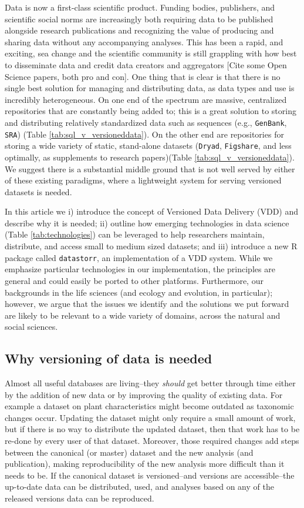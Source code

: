\documentclass[a4paper,11pt]{article}
\begin{document}
Data is now a first-class scientific product. Funding bodies, publishers, and scientific social norms are increasingly both requiring data to be published alongside research publications and recognizing the value of producing and sharing data without any accompanying analyses. This has been a rapid, and exciting, sea change and the scientific community is still grappling with how best to disseminate data and credit data creators and aggregators [Cite some Open Science papers, both pro and con]. One thing that is clear is that there is no single best solution for managing and distributing data, as data types and use is incredibly heterogeneous. On one end of the spectrum are massive, centralized repositories that are constantly being added to; this is a great solution to storing and distributing relatively standardized data such as sequences (e.g., \texttt{GenBank}, \texttt{SRA}) (Table \ref{tab:sql_v_versioneddata}). On the other end are repositories for storing a wide variety of static, stand-alone datasets (\texttt{Dryad}, \texttt{Figshare}, and less optimally, as supplements to research papers)(Table \ref{tab:sql_v_versioneddata}). We suggest there is a substantial middle ground that is not well served by either of these existing paradigms, where a lightweight system for serving versioned datasets is needed.

In this article we i) introduce the concept of Versioned Data Delivery (VDD) and describe why it is needed; ii) outline how emerging technologies in data science (Table \ref{tab:technologies}) can be leveraged to help researchers maintain, distribute, and access small to medium sized datasets; and iii) introduce a new R package called \texttt{datastorr}, an implementation of a VDD system. While we emphasize particular technologies in our implementation, the principles are general and could easily be ported to other platforms. Furthermore, our backgrounds in the life sciences (and ecology and evolution, in particular); however, we argue that the issues we identify and the solutions we put forward are likely to be relevant to a wide variety of domains, across the natural and social sciences.

\subsection{Why versioning of data is needed}

Almost all useful databases are living--they \emph{should} get better
through time either by the addition of new data or by improving the
quality of existing data. For example a dataset on plant characteristics
might become outdated as taxonomic changes occur. Updating the dataset might only
require a small amount of work, but if there is no
way to distribute the updated dataset, then that work has to be re-done by
every user of that dataset. Moreover, those required changes add steps
between the canonical (or master) dataset and the new analysis (and publication),
making reproducibility of the new analysis more difficult than it needs
to be. If the canonical dataset is versioned--and versions are
accessible--the up-to-date data can be distributed, used, and analyses
based on any of the released versions data can be reproduced.
\end{document}
